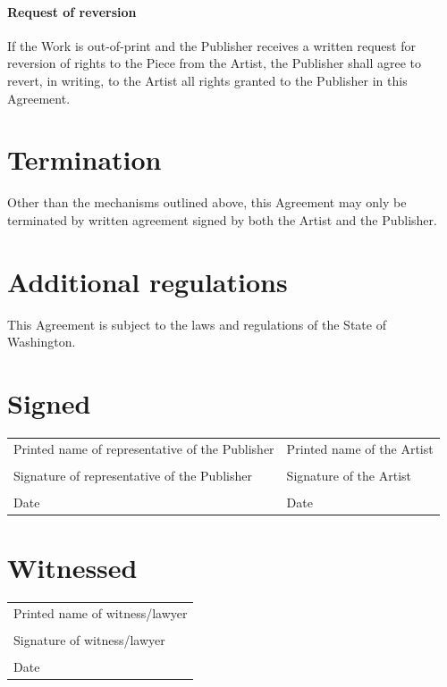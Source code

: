 \documentclass[12pt,letterpaper]{article}
\begin{document}
\paragraph{Request of reversion}

If the Work is out-of-print and the Publisher receives a written request for reversion of rights to the Piece from the Artist, the Publisher shall agree to revert, in writing, to the Artist all rights granted to the Publisher in this Agreement.

\section{Termination}

Other than the mechanisms outlined above, this Agreement may only be terminated by written agreement signed by both the Artist and the Publisher.

\section{Additional regulations}

This Agreement is subject to the laws and regulations of the State of Washington.

\newpage

\thispagestyle{final}

\section*{Signed}

\begin{tabular}{p{3in} | p{3in}}
    \vspace{0.5in} & \\ \hline
    Printed name of representative of the Publisher & Printed name of the Artist \\
    \vspace{0.5in} & \\ \hline
    Signature of representative of the Publisher & Signature of the Artist \\
    \vspace{0.5in} & \\ \hline
    Date & Date \\
\end{tabular}

\section*{Witnessed}

\begin{tabular}{l}
    \vspace{0.5in} \\ \hline
    Printed name of witness/lawyer \\
    \vspace{0.5in} \\ \hline
    Signature of witness/lawyer \\
    \vspace{0.5in} \\ \hline
    Date \\
\end{tabular}
\end{document}
